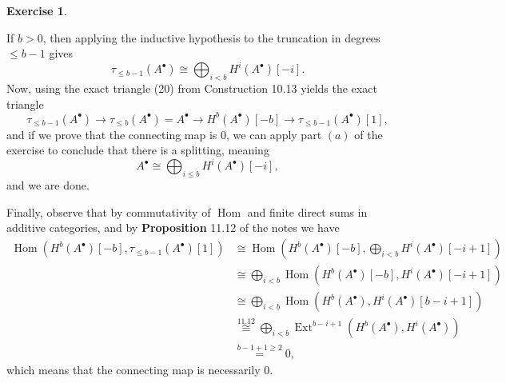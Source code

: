 \documentclass[a4paper]{article}
\newcommand{\Hom}{\operatorname{Hom}}
\newcommand{\Ext}{\operatorname{Ext}}
\theoremstyle{definition}
\theoremstyle{definition}
\theoremstyle{remark}
\theoremstyle{definition}
\newtheorem{exercise}{Exercise}[section]
\begin{document}
\begin{exercise}
\begin{itemize}
			If $b>0$, then applying the inductive hypothesis to the truncation in degrees $\leq b-1$ gives
			$$ \tau_{\leq b-1}(A^\bullet)\cong\bigoplus_{i<b}{H^i(A^\bullet)[-i]} .$$
			Now, using the exact triangle (20) from Construction 10.13 yields the exact triangle
			$$\tau_{\leq b-1}(A^\bullet)\rightarrow \tau_{\leq b}(A^\bullet)=A^\bullet\rightarrow H^b(A^\bullet)[-b]\rightarrow\tau_{\leq b-1}(A^\bullet)[1],$$
			and if we prove that the connecting map is $0$, we can apply part $(a)$ of the exercise to conclude that there is a splitting, meaning
			$$ A^\bullet\cong\bigoplus_{i\leq b}{H^i(A^\bullet)[-i]} ,$$
			and we are done.

			Finally, observe that by commutativity of $\Hom$ and finite direct sums in additive categories, and by \textbf{Proposition} 11.12 of the notes we have
			\begin{align*}
				\Hom(H^b(A^\bullet)[-b],\tau_{\leq b-1}(A^\bullet)[1])&\cong\Hom\left(H^b(A^\bullet)[-b], \bigoplus_{i<b}{H^i(A^\bullet)[-i+1]} \right)\\
										      &\cong\bigoplus_{i<b}\Hom\left( H^b(A^\bullet)[-b], H^i(A^\bullet)[-i+1] \right)\\
										      &\cong\bigoplus_{i<b}\Hom\left( H^b(A^\bullet), H^i(A^\bullet)[b-i+1] \right)\\
										      &\overset{11.12}{\cong}\bigoplus_{i<b}\Ext^{b-i+1}\left( H^b(A^\bullet), H^i(A^\bullet) \right)\\
										      &\overset{b-1+1\geq 2}{=}0,
			\end{align*}
			which means that the connecting map is necessarily $0$.
	\end{itemize}
\end{exercise}
\end{document}
